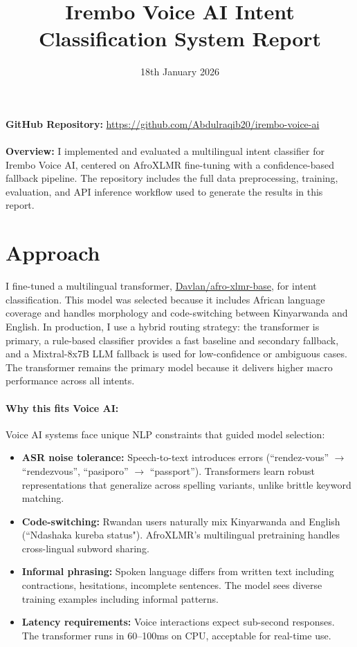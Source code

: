 \documentclass[11pt]{article}
\title{Irembo Voice AI Intent Classification System Report}
\author{}
\date{18th January 2026}
\begin{document}
\maketitle

\noindent\textbf{GitHub Repository:} \url{https://github.com/Abdulraqib20/irembo-voice-ai} \\ \\
\textbf{Overview:} I implemented and evaluated a multilingual intent classifier for Irembo Voice AI, centered on AfroXLMR fine-tuning with a confidence-based fallback pipeline. The repository includes the full data preprocessing, training, evaluation, and API inference workflow used to generate the results in this report.

\section*{Approach}
I fine-tuned a multilingual transformer, \href{https://huggingface.co/Davlan/afro-xlmr-base}{Davlan/afro-xlmr-base}, for intent classification. This model was selected because it includes African language coverage and handles morphology and code-switching between Kinyarwanda and English. In production, I use a hybrid routing strategy: the transformer is primary, a rule-based classifier provides a fast baseline and secondary fallback, and a Mixtral-8x7B LLM fallback is used for low-confidence or ambiguous cases. The transformer remains the primary model because it delivers higher macro performance across all intents.

\paragraph{Why this fits Voice AI:}
Voice AI systems face unique NLP constraints that guided model selection:
\begin{itemize}
  \item \textbf{ASR noise tolerance:} Speech-to-text introduces errors (``rendez-vous'' $\rightarrow$ ``rendezvous'', ``pasiporo'' $\rightarrow$ ``passport''). Transformers learn robust representations that generalize across spelling variants, unlike brittle keyword matching.
  \item \textbf{Code-switching:} Rwandan users naturally mix Kinyarwanda and English (``Ndashaka kureba status"). AfroXLMR's multilingual pretraining handles cross-lingual subword sharing.
  \item \textbf{Informal phrasing:} Spoken language differs from written text including contractions, hesitations, incomplete sentences. The model sees diverse training examples including informal patterns.
  \item \textbf{Latency requirements:} Voice interactions expect sub-second responses. The transformer runs in 60--100ms on CPU, acceptable for real-time use.
\end{itemize}
\end{document}
